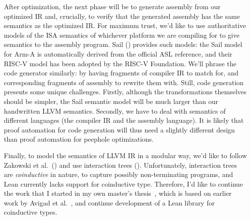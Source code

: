 \documentclass[a4paper]{scrartcl}
\begin{document}

After optimization, the next phase will be to generate assembly from our
optimized IR and, crucially, to verify that the generated assembly has
the same semantics as the optimized IR. For maximum trust, we'd like to
use authoritative models of the ISA semantics of whichever platform we
are compiling for to give semantics to the assembly program. Sail
(\cite{armstrongISASemanticsARMv8a2019}) provides such models: the
Sail model for Arm-A is automatically derived from the official ASL
reference, and their RISC-V model has been adopted by the RISC-V
Foundation. We'll phrase the code generator similarly: by having
fragments of compiler IR to match for, and corresponding fragments of
assembly to rewrite them with. Still, code generation presents some
unique challenges. Firstly, although the transformations themselves
should be simpler, the Sail semantic model will be much larger than our
handwritten LLVM semantics. Secondly, we have to deal with semantics of
different languages (the compiler IR and the assembly language). It is
likely that proof automation for code generation will thus need a
slightly different design than proof automation for peephole
optimizations.

Finally, to model the semantics of LLVM IR in a modular way, we'd like
to follow Zakowski et
al.~(\cite{zakowskiModularCompositionalExecutable2021}) and use
interaction trees (\cite{xiaInteractionTreesRepresenting2020}).
Unfortunately, interaction trees are \emph{coinductive} in nature, to
capture possibly non-terminating programs, and Lean currently lacks
support for coinductive type. Therefore, I'd like to continue the work
that I started in my own master's thesis~\cite{keizerImplementingDefinitionalCodatatype}, which is based on earlier
work by Avigad et al.~\cite{avigadDataTypesQuotients2019}, and
continue development of a Lean library for coinductive types.
\end{document}
